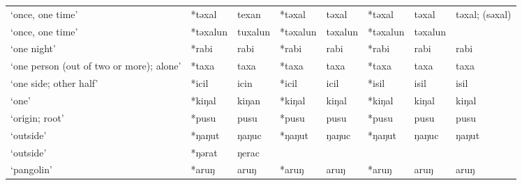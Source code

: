 \begin{landscape}
\begin{longtable}[c]{@{}p{3cm}<{\raggedright}p{2.75cm}<{\raggedright}p{2.75cm}<{\raggedright}p{2.75cm}<{\raggedright}p{2.75cm}<{\raggedright}p{2.75cm}<{\raggedright}p{2.75cm}<{\raggedright}p{2.75cm}<{\raggedright}@{}}
`once, one time'                                     & *təxal       & texan                         & *təxal         & təxal                      & *təxal           & təxal                    & təxal; (səxal)                    \\
`once, one time'                                     & *təxalun     & tuxalun                       & *təxalun       & təxalun                    & *təxalun         & təxalun                  &                                   \\
`one night'                                          & *rabi        & rabi                          & *rabi          & rabi                       & *rabi            & rabi                     & rabi                              \\
`one person (out of two or more); alone'             & *taxa        & taxa                          & *taxa          & taxa                       & *taxa            & taxa                     & taxa                              \\
`one side; other half'                               & *icil        & icin                          & *icil          & icil                       & *isil            & isil                     & isil                              \\
`one'                                                & *kiŋal       & kiŋan                         & *kiŋal         & kiŋal                      & *kiŋal           & kiŋal                    & kiŋal                             \\
`origin; root'                                       & *pusu        & pusu                          & *pusu          & pusu                       & *pusu            & pusu                     & pusu                              \\
`outside'                                            & *ŋaŋut       & ŋaŋuc                         & *ŋaŋut         & ŋaŋuc                      & *ŋaŋut           & ŋaŋuc                    & ŋaŋut                             \\
`outside'                                            & *ŋərat       & ŋerac                         &                &                            &                  &                          &                                   \\
`pangolin'                                           & *aruŋ        & aruŋ                          & *aruŋ          & aruŋ                       & *aruŋ            & aruŋ                     & aruŋ                              \\

\end{longtable}
\end{landscape}
